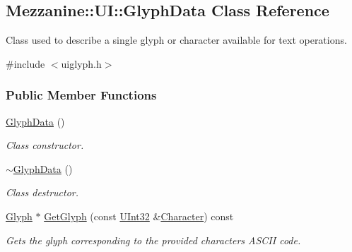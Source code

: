 \hypertarget{classMezzanine_1_1UI_1_1GlyphData}{
\subsection{Mezzanine::UI::GlyphData Class Reference}
\label{classMezzanine_1_1UI_1_1GlyphData}
}


Class used to describe a single glyph or character available for text operations.  




{\ttfamily \#include $<$uiglyph.h$>$}

\subsubsection*{Public Member Functions}
\begin{DoxyCompactItemize}
\item 
\hypertarget{classMezzanine_1_1UI_1_1GlyphData_afeaf0f6b4a3f198ececc0cf25bd6ef54}{
\hyperlink{classMezzanine_1_1UI_1_1GlyphData_afeaf0f6b4a3f198ececc0cf25bd6ef54}{GlyphData} ()}
\label{classMezzanine_1_1UI_1_1GlyphData_afeaf0f6b4a3f198ececc0cf25bd6ef54}

\begin{DoxyCompactList}\small\item\em Class constructor. \item\end{DoxyCompactList}\item 
\hypertarget{classMezzanine_1_1UI_1_1GlyphData_a9f15d3d68366e867a7aa2430e642b3f9}{
\hyperlink{classMezzanine_1_1UI_1_1GlyphData_a9f15d3d68366e867a7aa2430e642b3f9}{$\sim$GlyphData} ()}
\label{classMezzanine_1_1UI_1_1GlyphData_a9f15d3d68366e867a7aa2430e642b3f9}

\begin{DoxyCompactList}\small\item\em Class destructor. \item\end{DoxyCompactList}\item 
\hyperlink{classMezzanine_1_1UI_1_1Glyph}{Glyph} $\ast$ \hyperlink{classMezzanine_1_1UI_1_1GlyphData_a1fff126b65029b2610eae9e2a160a77f}{GetGlyph} (const \hyperlink{namespaceMezzanine_abea3b8e8e9b03d2547b2800284ba682d}{UInt32} \&\hyperlink{structMezzanine_1_1UI_1_1Character}{Character}) const 
\begin{DoxyCompactList}\small\item\em Gets the glyph corresponding to the provided characters ASCII code. \item\end{DoxyCompactList}\end{DoxyCompactItemize}
